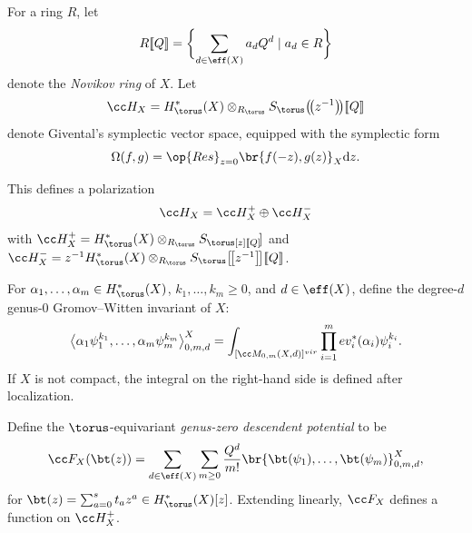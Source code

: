 For a ring $R$, let
\[
R[\![Q]\!] = \biggl\{ \sum_{d\in \eff(X)} a_d Q^d \mid a_d \in R \biggr\}
\]
denote the \emph{Novikov ring} of $X$.
Let
\[
\cc H_X = H^*_\torus(X) \otimes_{R_\torus} S_\torus\bigl(\!\bigl(z^{-1}\bigr)\!\bigr)[\![Q]\!]
\]
denote Givental's symplectic vector space, equipped with the symplectic form
\begin{equation*}%
\Omega(f, g) = \op{Res}_{z = 0}\br{f(-z), g(z)}_X {\rm d}z.
\end{equation*}


This defines a polarization
\[
\cc H_X = \cc H_X^+ \oplus \cc H_X^-
\]
with $\cc H_X^+ = H^*_\torus(X) \otimes_{R_\torus} S_\torus[z][\![Q]\!]$ and
$\cc H_X^- = z^{-1} H^*_\torus(X) \otimes_{R_\torus} S_\torus \bigl[\!\bigl[z^{-1}\bigr]\!\bigr] [\![Q]\!]$.

For $\alpha_1, \dots, \alpha_m \in H^*_\torus(X)$, $k_1, \dots, k_m \geq 0$, and $d \in \eff(X)$, define the degree-$d$ genus-0 Gromov--Witten invariant of $X$:
\[
\big\langle\alpha_1 \psi_1^{k_1}, \dots, \alpha_m \psi_m^{k_m}\bigr\rangle_{0, m ,d}^X = \int_{[\cc M_{0, m}(X, d)]^{vir}} \prod_{i=1}^m ev_i^*(\alpha_i) \psi_i^{k_i}.
\]
If $X$ is not compact, the integral on the right-hand side is defined after localization.
\begin{Definition}
Define the $\torus$-equivariant \emph{genus-zero descendent potential} to be
\begin{equation*}
\cc F_X(\bt(z)) = \sum_{d \in \eff(X)} \sum_{m \geq 0} \frac{Q^d}{m!} \br{\bt(\psi_1), \dots, \bt(\psi_m)}_{0, m, d}^X,
\end{equation*}
for $\bt(z) = \sum_{a=0}^s t_a z^a \in H^*_\torus(X)[z]$. Extending linearly, $\cc F_X$ defines a function on $\cc H_X^+$.
\end{Definition}

